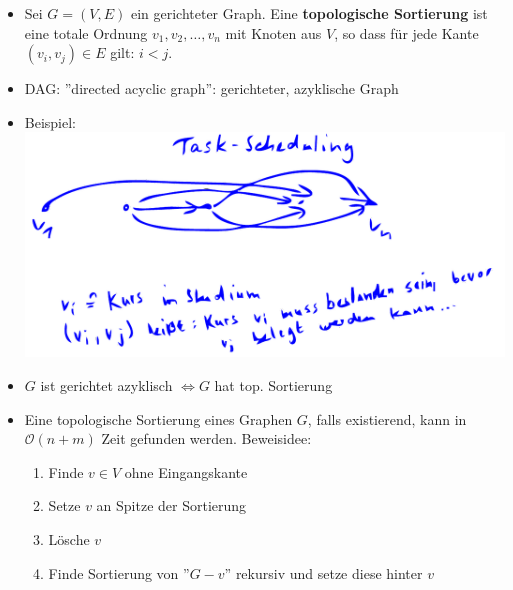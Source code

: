 \documentclass{scrartcl}
\begin{document}
\begin{itemize}
	\item Sei $ G = (V,E) $ ein gerichteter Graph. Eine \textbf{topologische Sortierung} ist eine totale Ordnung $ v_1,v_2,\ldots,v_n $ mit Knoten aus $ V $, so dass für jede Kante $ (v_i,v_j) \in E $ gilt: $ i < j $.
	\item DAG: ''directed acyclic graph'': gerichteter, azyklische Graph
	\item Beispiel: \\
	\includegraphics[width=\linewidth]{figures/task-scheduling.pdf}
	\item $ G $ ist gerichtet azyklisch $ \iff G $ hat top. Sortierung
	\item Eine topologische Sortierung eines Graphen $ G $, falls existierend, kann in $ \mathcal{O}(n+m) $ Zeit gefunden werden. Beweisidee:
	\begin{enumerate}
		\item Finde $ v \in V $ ohne Eingangskante
		\item Setze $ v $ an Spitze der Sortierung
		\item Lösche $ v $
		\item Finde Sortierung von ''$ G - v $'' rekursiv und setze diese hinter $ v $
	\end{enumerate}
\end{itemize}
\end{document}
